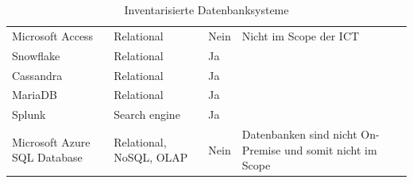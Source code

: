\begin{flushleft}
\begin{table}[H]
{\begin{tabular}{@{}llll@{}}
    \Gls{Microsoft Access}             & Relational               & Nein                    & Nicht im Scope der ICT                                                        \\
    \Gls{Snowflake}                    & Relational               & Ja                      &                                                                               \\
    \Gls{Cassandra}                    & Relational               & Ja                      &                                                                               \\
    \Gls{MariaDB}                      & Relational               & Ja                      &                                                                               \\
    \Gls{Splunk}                       & Search engine            & Ja                      &                                                                               \\
    \Gls{Microsoft Azure SQL Database} & Relational, \Gls{NoSQL}, \Gls{OLAP}  & Nein                    & Datenbanken sind nicht On-Premise und somit nicht im Scope                    \\ \bottomrule
    \end{tabular}%
    }
    \caption{Inventarisierte Datenbanksysteme}
    \label{tab:Inventarisierte Datenbanksysteme}
    \end{table}
\end{flushleft}
